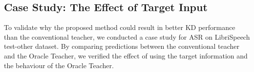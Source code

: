 \documentclass[journal]{IEEEtran}
\begin{document}





\subsection{Case Study: The Effect of Target Input}
\label{case_sec}
To validate why the proposed method could result in better KD performance than the conventional teacher, we conducted a case study for ASR on LibriSpeech test-other dataset.
By comparing predictions between the conventional teacher and the Oracle Teacher, we verified the effect of using the target information and the behaviour of the Oracle Teacher.
\end{document}
